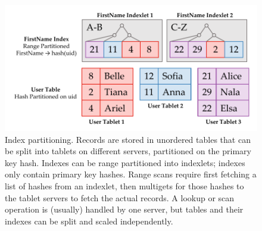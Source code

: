 \begin{figure}[t]
\centering
\includegraphics[width=1.0\columnwidth]{figures/ramcloud-index.pdf}
\caption{Index partitioning. Records are stored in unordered tables that can be
  split into tablets on different servers, partitioned on the primary key hash.
  Indexes can be range partitioned into indexlets; indexes only contain primary
  key hashes. Range scans require first fetching a list of hashes from an
  indexlet, then multigets for those hashes to the tablet servers to fetch the
  actual records.  A lookup or scan operation is (usually) handled by one
  server, but tables and their indexes can be split and scaled independently.}
\label{fig:index}
\end{figure}
